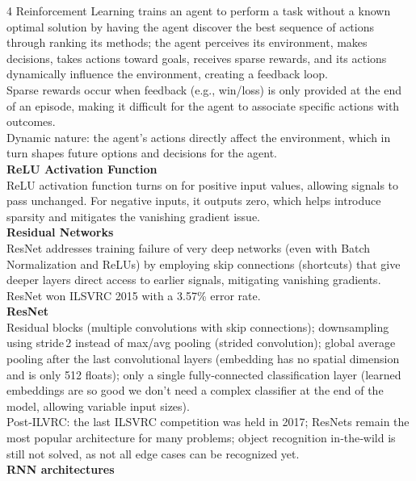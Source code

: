 \documentclass[8pt]{extarticle}
\begin{document}
\begin{multicols}{4}
Reinforcement Learning trains an agent to perform a task without a known optimal solution by having the agent discover the best sequence of actions through ranking its methods; the agent perceives its environment, makes decisions, takes actions toward goals, receives sparse rewards, and its actions dynamically influence the environment, creating a feedback loop.\\
Sparse rewards occur when feedback (e.g., win/loss) is only provided at the end of an episode, making it difficult for the agent to associate specific actions with outcomes.\\
Dynamic nature: the agent’s actions directly affect the environment, which in turn shapes future options and decisions for the agent.\\
\vspace{2pt}\textbf{ReLU Activation Function}\\
ReLU activation function turns on for positive input values, allowing signals to pass unchanged. For negative inputs, it outputs zero, which helps introduce sparsity and mitigates the vanishing gradient issue.\\
\vspace{2pt}\textbf{Residual Networks}\\
ResNet addresses training failure of very deep networks (even with Batch Normalization and ReLUs) by employing skip connections (shortcuts) that give deeper layers direct access to earlier signals, mitigating vanishing gradients.\\
ResNet won ILSVRC 2015 with a 3.57\% error rate.\\
\vspace{2pt}\textbf{ResNet}\\
Residual blocks (multiple convolutions with skip connections); downsampling using stride 2 instead of max/avg pooling (strided convolution); global average pooling after the last convolutional layers (embedding has no spatial dimension and is only 512 floats); only a single fully‑connected classification layer (learned embeddings are so good we don’t need a complex classifier at the end of the model, allowing variable input sizes).\\
Post‑ILVRC: the last ILSVRC competition was held in 2017; ResNets remain the most popular architecture for many problems; object recognition in‑the‑wild is still not solved, as not all edge cases can be recognized yet.\\
\vspace{2pt}\textbf{RNN architectures}\\

\end{multicols}
\end{document}
